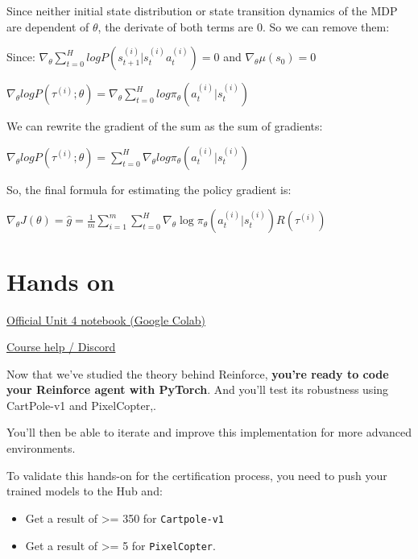 \documentclass[11pt,a4paper]{article}
\begin{document}
Since neither initial state distribution or state transition dynamics of the MDP are dependent of \(\theta\), the derivate of both terms are 0. So we can remove them:

Since: \(\nabla_\theta \sum_{t=0}^{H} log P(s_{t+1}^{(i)}|s_{t}^{(i)}  a_{t}^{(i)}) = 0\) and \(\nabla_\theta \mu(s_0) = 0\)

\(\nabla_\theta log P(\tau^{(i)};\theta) =   \nabla_\theta \sum_{t=0}^{H} log \pi_\theta(a_{t}^{(i)}|s_{t}^{(i)})\)

We can rewrite the gradient of the sum as the sum of gradients:

\(\nabla_\theta log P(\tau^{(i)};\theta)=    \sum_{t=0}^{H} \nabla_\theta log \pi_\theta(a_{t}^{(i)}|s_{t}^{(i)})\)

So, the final formula for estimating the policy gradient is:

\(\nabla_{\theta} J(\theta) = \hat{g} = \frac{1}{m} \sum^{m}_{i=1} \sum^{H}_{t=0} \nabla_\theta \log \pi_\theta(a^{(i)}_{t} | s_{t}^{(i)})R(\tau^{(i)})\)

\section{Hands on}\label{hands-on}

\href{https://colab.research.google.com/github/huggingface/deep-rl-class/blob/main/notebooks/unit4/unit4.ipynb}{Official Unit 4 notebook (Google Colab)}

\href{http://hf.co/join/discord}{Course help / Discord}

Now that we've studied the theory behind Reinforce, \textbf{you're ready to code your Reinforce agent with PyTorch}. And you'll test its robustness using CartPole-v1 and PixelCopter,.

You'll then be able to iterate and improve this implementation for more advanced environments.


To validate this hands-on for the certification process, you need to push your trained models to the Hub and:

\begin{itemize}
\tightlist
\item
  Get a result of \textgreater= 350 for \texttt{Cartpole-v1}
\item
  Get a result of \textgreater= 5 for \texttt{PixelCopter}.
\end{itemize}
\end{document}
